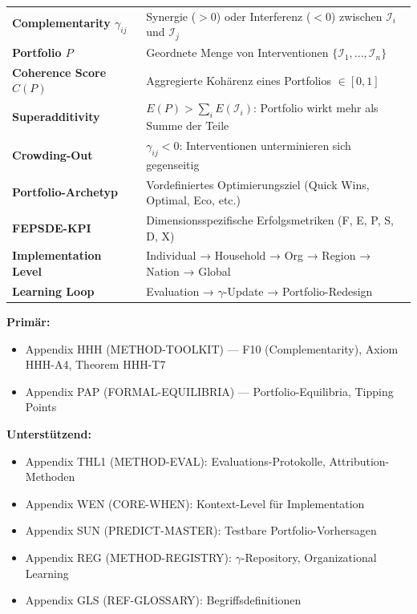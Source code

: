 \begin{tcolorbox}[colback=blue!5!white, colframe=blue!75!black,
    title=Zentrale Begriffe in diesem Kapitel]
\small
\begin{tabular}{@{}ll@{}}
\textbf{Complementarity $\gamma_{ij}$} & Synergie ($>0$) oder Interferenz ($<0$) zwischen $\mathcal{I}_i$ und $\mathcal{I}_j$ \\
\textbf{Portfolio $P$} & Geordnete Menge von Interventionen $\{\mathcal{I}_1, ..., \mathcal{I}_n\}$ \\
\textbf{Coherence Score $C(P)$} & Aggregierte Kohärenz eines Portfolios $\in [0, 1]$ \\
\textbf{Superadditivity} & $E(P) > \sum_i E(\mathcal{I}_i)$: Portfolio wirkt mehr als Summe der Teile \\
\textbf{Crowding-Out} & $\gamma_{ij} < 0$: Interventionen unterminieren sich gegenseitig \\
\textbf{Portfolio-Archetyp} & Vordefiniertes Optimierungsziel (Quick Wins, Optimal, Eco, etc.) \\
\textbf{FEPSDE-KPI} & Dimensionsspezifische Erfolgsmetriken (F, E, P, S, D, X) \\
\textbf{Implementation Level} & Individual → Household → Org → Region → Nation → Global \\
\textbf{Learning Loop} & Evaluation → $\gamma$-Update → Portfolio-Redesign \\
\end{tabular}
\end{tcolorbox}

\begin{tcolorbox}[colback=yellow!10!white, colframe=orange!75!black,
    title=Appendix References for This Chapter]

\textbf{Primär:}
\begin{itemize}[nosep]
\item Appendix HHH (METHOD-TOOLKIT) --- F10 (Complementarity), Axiom HHH-A4, Theorem HHH-T7
\item Appendix PAP (FORMAL-EQUILIBRIA) --- Portfolio-Equilibria, Tipping Points
\end{itemize}

\textbf{Unterstützend:}
\begin{itemize}[nosep]
\item Appendix THL1 (METHOD-EVAL): Evaluations-Protokolle, Attribution-Methoden
\item Appendix WEN (CORE-WHEN): Kontext-Level für Implementation
\item Appendix SUN (PREDICT-MASTER): Testbare Portfolio-Vorhersagen
\item Appendix REG (METHOD-REGISTRY): $\gamma$-Repository, Organizational Learning
\item Appendix GLS (REF-GLOSSARY): Begriffsdefinitionen
\end{itemize}
\end{tcolorbox}

